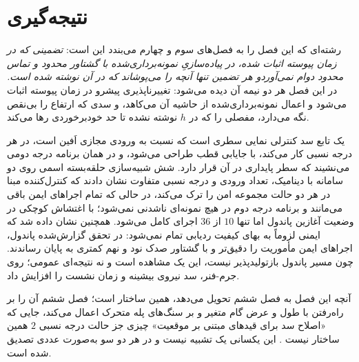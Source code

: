 \documentclass[10pt,twocolumn]{article}
\newcommand{\en}[1]{\lr{#1}}
\newcommand{\md}{\lr{\textemdash}}
\begin{document}
\section{نتیجه‌گیری}
رشته‌ای که این فصل را به فصل‌های سوم و چهارم می‌بندد این است: \emph{تضمینی که در زمان
پیوسته اثبات شده، در پیاده‌سازیِ نمونه‌برداری‌شده با گشتاور محدود و تماس محدود دوام
نمی‌آورد\md{}و هر تضمین تنها آنچه را می‌پوشاند که در آن نوشته شده است.} در این فصل هر دو
نیمه آن دیده می‌شود: تغییرناپذیری پیشرو در زمان پیوسته اثبات می‌شود و اعمال نمونه‌برداری‌شده
از حاشیه آن می‌کاهد، و سدی که ارتفاع را بی‌نقص نگه می‌دارد، مفصلی را که در $h$ نوشته نشده
تا حد خودبرخوردی رها می‌کند.

یک تابع سد کنترلی نمایی سطری است که نسبت به ورودی مجازی اَفین است، در هر درجه
نسبی کار می‌کند، با جایابی قطب طراحی می‌شود، و در همان برنامه درجه دومی می‌نشیند
که سطر پایداری در آن قرار دارد. شش شبیه‌سازی حلقه‌بسته اسمی روی دو سامانه با
دینامیک، تعداد ورودی و درجه نسبی متفاوت نشان دادند که کنترل‌کننده مبنا در هر دو
حالت مجموعه امن را ترک می‌کند، در حالی که تمام اجراهای \en{ECBF} ایمن باقی
می‌مانند و برنامه درجه دوم در هیچ نمونه‌ای ناشدنی نمی‌شود؛ با اغتشاش کوچکی در وضعیت آغازین
پاندول اما تنها $10$ از $36$ اجرای \en{ECBF} کامل می‌شود. همچنین نشان داده شد
که ایمنی لزوماً به بهای کیفیت ردیابی تمام نمی‌شود: در تحقق گزارش‌شده پاندول، اجراهای ایمن
مأموریت را دقیق‌تر و با گشتاور صدک نود و نهم کمتری به پایان رساندند. چون مسیر پاندول
بازتولیدپذیر نیست، این یک مشاهده است و نه نتیجه‌ای عمومی؛ روی جرم-فنر، سد نیروی بیشینه و
زمان نشست را افزایش داد.

آنچه این فصل به فصل ششم تحویل می‌دهد، همین ساختار است؛ فصل ششم آن را بر راه‌رفتن
با طول و عرض گام متغیر و بر سنگ‌های پله متحرک اعمال می‌کند، جایی که «اصلاح سد
برای قیدهای مبتنی بر موقعیت» چیزی جز حالت درجه نسبی $2$ همین ساختار نیست
\cite{nguyen2015footstep}. این یکسانی یک تشبیه نیست و در هر دو سو به‌صورت عددی
تصدیق شده است.
\end{document}
